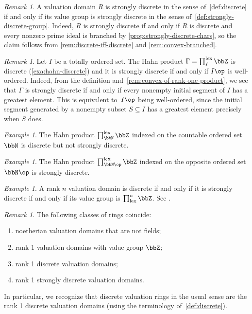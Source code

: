 \documentclass{amsart}
\numberwithin{equation}{section}%
\theoremstyle{remark}
\newtheorem{Exa}[equation]{Example}
\newtheorem{Rem}[equation]{Remark}
\newcounter{enum-resume-hack}
\begin{document}
\begin{Rem}
	A valuation domain $R$ is strongly discrete in the sense of~\cref{def:discrete} if and only if its value group is strongly discrete in the sense of~\cref{def:strongly-discrete-group}. Indeed, $R$ is strongly discrete if and only if $R$ is discrete and every nonzero prime ideal is branched by \cref{prop:strongly-discrete-chars}, so the claim follows from \cref{rem:discrete-iff-discrete} and \cref{rem:convex-branched}.
\end{Rem}

\begin{Rem}\label{rem:hahn-strongly-discrete}
	Let $I$ be a totally ordered set. The Hahn product $\Gamma = \prod_I^{\mathrm{lex}}\bbZ$ is discrete (\cref{exa:hahn-discrete}) and it is strongly discrete if and only if $I\op$ is well-ordered. Indeed, from the definition and~\cref{rem:convex-of-rank-one-product}, we see that $\Gamma$ is strongly discrete if and only if every nonempty initial segment of $I$ has a greatest element. This is equivalent to~$I\op$ being well-ordered, since the initial segment generated by a nonempty subset $S\subseteq I$ has a greatest element precisely when $S$ does.
\end{Rem}

\begin{Exa}\label{exa:lex-N-Z}
	The Hahn product $\prod_{\bbN}^{\mathrm{lex}} \bbZ$ indexed on the countable ordered set~$\bbN$ is discrete but not strongly discrete.
\end{Exa}

\begin{Exa}
	The Hahn product $\prod_{\bbN\op}^{\mathrm{lex}} \bbZ$ indexed on the opposite ordered set $\bbN\op$ is strongly discrete.
\end{Exa}

\begin{Exa}
	A rank $n$ valuation domain is discrete if and only if it is strongly discrete if and only if its value group is $\prod_{\mathrm{lex}}^n \bbZ$. See \cite[Proposition~II.8.4]{FuchsSalce01}.
\end{Exa}

\begin{Rem}
	The following classes of rings coincide:
	\begin{enumerate}
		\item noetherian valuation domains that are not fields;
		\item rank 1 valuation domains with value group $\bbZ$;
		\item rank 1 discrete valuation domains;
		\item rank 1 strongly discrete valuation domains.
	\end{enumerate}
	In particular, we recognize that discrete valuation rings in the usual sense are the rank 1 discrete valuation domains (using the terminology of~\cref{def:discrete}).
\end{Rem}
\end{document}
